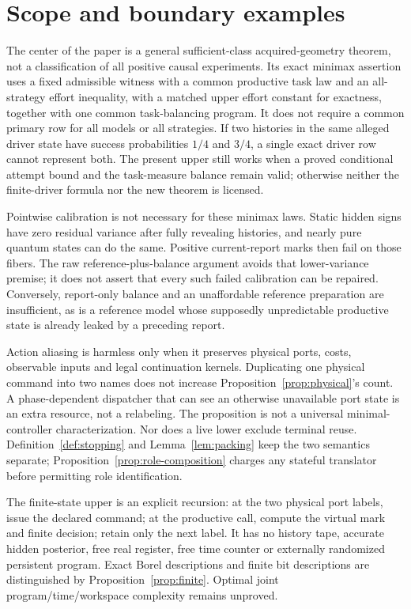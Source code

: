 \section{Scope and boundary examples}
\label{sec:scope}
The center of the paper is a general sufficient-class acquired-geometry theorem, not a classification of all positive causal experiments. Its exact minimax assertion uses a fixed admissible witness with a common productive task law and an all-strategy effort inequality, with a matched upper effort constant for exactness, together with one common task-balancing program. It does not require a common primary row for all models or all strategies. If two histories in the same alleged driver state have success probabilities $1/4$ and $3/4$, a single exact driver row cannot represent both. The present upper still works when a proved conditional attempt bound and the task-measure balance remain valid; otherwise neither the finite-driver formula nor the new theorem is licensed.

Pointwise calibration is not necessary for these minimax laws. Static hidden signs have zero residual variance after fully revealing histories, and nearly pure quantum states can do the same. Positive current-report marks then fail on those fibers. The raw reference-plus-balance argument avoids that lower-variance premise; it does not assert that every such failed calibration can be repaired. Conversely, report-only balance and an unaffordable reference preparation are insufficient, as is a reference model whose supposedly unpredictable productive state is already leaked by a preceding report.

Action aliasing is harmless only when it preserves physical ports, costs, observable inputs and legal continuation kernels. Duplicating one physical command into two names does not increase Proposition~\ref{prop:physical}'s count. A phase-dependent dispatcher that can see an otherwise unavailable port state is an extra resource, not a relabeling. The proposition is not a universal minimal-controller characterization. Nor does a live lower exclude terminal reuse. Definition~\ref{def:stopping} and Lemma~\ref{lem:packing} keep the two semantics separate; Proposition~\ref{prop:role-composition} charges any stateful translator before permitting role identification.

The finite-state upper is an explicit recursion: at the two physical port labels, issue the declared command; at the productive call, compute the virtual mark and finite decision; retain only the next label. It has no history tape, accurate hidden posterior, free real register, free time counter or externally randomized persistent program. Exact Borel descriptions and finite bit descriptions are distinguished by Proposition~\ref{prop:finite}. Optimal joint program/time/workspace complexity remains unproved.


